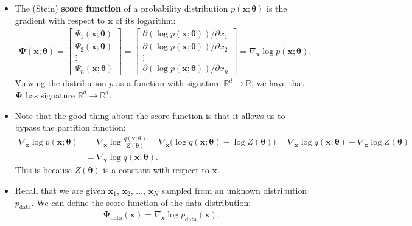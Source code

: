 \documentclass[10pt]{article}
\newcommand{\ve}[1]{\mathbf{#1}}
\newcommand{\mrm}[1]{\mathrm{#1}}
\newcommand{\Real}{\mathbb{R}}
\begin{document}
\begin{itemize}
  \item The (Stein) {\bf score function} of a probability distribution $p(\ve{x};\boldsymbol{\theta})$ is the gradient with respect to $\ve{x}$ of its logarithm:
  \begin{align*}
      \boldsymbol{\Psi}(\ve{x};\boldsymbol{\theta})
      = \begin{bmatrix}
          \Psi_1(\ve{x};\boldsymbol{\theta}) \\
          \Psi_2(\ve{x};\boldsymbol{\theta}) \\
          \vdots \\
          \Psi_n(\ve{x};\boldsymbol{\theta})
      \end{bmatrix}
      = \begin{bmatrix}
          \partial(\log p(\ve{x};\boldsymbol{\theta})) / \partial x_1 \\
          \partial(\log p(\ve{x};\boldsymbol{\theta})) / \partial x_2 \\
          \vdots \\
          \partial(\log p(\ve{x};\boldsymbol{\theta})) / \partial x_n
      \end{bmatrix}
      = \nabla_{\ve{x}} \log p(\ve{x};\boldsymbol{\theta}).
  \end{align*}
  Viewing the distribution $p$ as a function with signature $\Real^d \rightarrow \Real$, we have that $\boldsymbol{\Psi}$ has signature $\Real^d \rightarrow \Real^d$.

  \item Note that the good thing about the score function is that it allows us to bypass the partition function:
  \begin{align*}
      \nabla_{\ve{x}} \log p(\ve{x};\boldsymbol{\theta})
      &= \nabla_{\ve{x}} \log \frac{q(\ve{x};\boldsymbol{\theta})}{Z(\boldsymbol{\theta})}
      = \nabla_{\ve{x}} \big( \log q(\ve{x};\boldsymbol{\theta}) - \log Z(\boldsymbol{\theta}) \big)
      = \nabla_{\ve{x}} \log q(\ve{x};\boldsymbol{\theta}) - \nabla_{\ve{x}} \log Z(\boldsymbol{\theta}) \\
      &= \nabla_{\ve{x}} \log q(\ve{x};\boldsymbol{\theta}).
  \end{align*}
  This is because $Z(\boldsymbol{\theta})$ is a constant with respect to $\ve{x}$.

  \item Recall that we are given $\ve{x}_1$, $\ve{x}_2$, $\dotsc$, $\ve{x}_N$ sampled from an unknown distribution $p_{\mrm{data}}$. We can define the score function of the data distribution:
  \begin{align*}
      \boldsymbol{\Psi}_{\mrm{data}}(\ve{x}) = \nabla_{\ve{x}} \log p_{\mrm{data}}(\ve{x}).
  \end{align*}


\end{itemize}
\end{document}
